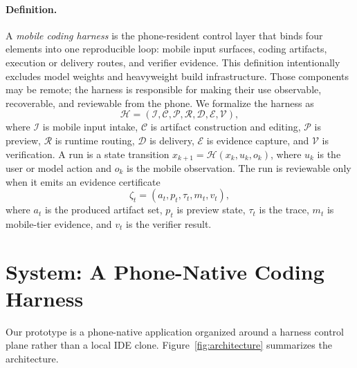 \documentclass{article}
\begin{document}
\paragraph{Definition.}
A \emph{mobile coding harness} is the phone-resident control layer that binds four elements into one reproducible loop: mobile input surfaces, coding artifacts, execution or delivery routes, and verifier evidence.
This definition intentionally excludes model weights and heavyweight build infrastructure.
Those components may be remote; the harness is responsible for making their use observable, recoverable, and reviewable from the phone.
We formalize the harness as
\[
\mathcal{H}=(\mathcal{I},\mathcal{C},\mathcal{P},\mathcal{R},\mathcal{D},\mathcal{E},\mathcal{V}),
\]
where \(\mathcal{I}\) is mobile input intake, \(\mathcal{C}\) is artifact construction and editing, \(\mathcal{P}\) is preview, \(\mathcal{R}\) is runtime routing, \(\mathcal{D}\) is delivery, \(\mathcal{E}\) is evidence capture, and \(\mathcal{V}\) is verification.
A run is a state transition \(x_{k+1}=\mathcal{H}(x_k,u_k,o_k)\), where \(u_k\) is the user or model action and \(o_k\) is the mobile observation.
The run is reviewable only when it emits an evidence certificate
\[
\zeta_t=(a_t,p_t,\tau_t,m_t,v_t),
\]
where \(a_t\) is the produced artifact set, \(p_t\) is preview state, \(\tau_t\) is the trace, \(m_t\) is mobile-tier evidence, and \(v_t\) is the verifier result.

\section{System: A Phone-Native Coding Harness}

Our prototype is a phone-native application organized around a harness control plane rather than a local IDE clone.
Figure~\ref{fig:architecture} summarizes the architecture.
\end{document}
